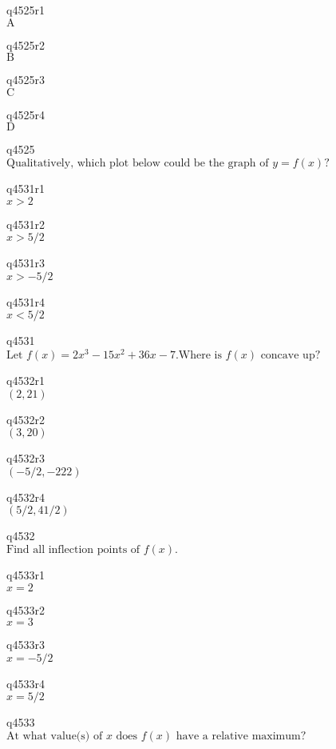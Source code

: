 q4525r1\\
\(\displaystyle \text{A} \)

q4525r2\\
\(\displaystyle \text{B} \)

q4525r3\\
\(\displaystyle \text{C} \)

q4525r4\\
\(\displaystyle \text{D} \)

q4525\\
\(\displaystyle \text{Qualitatively, which plot below could be the graph of } y = f(x)? \)

q4531r1\\
\(\displaystyle x > 2 \)

q4531r2\\
\(\displaystyle x > 5/2 \)

q4531r3\\
\(\displaystyle x > -5/2 \)

q4531r4\\
\(\displaystyle x < 5/2 \)

q4531\\
\(\displaystyle \text{Let } f(x) = 2x^3 - 15x^2 + 36x - 7. \text{Where is } f(x) \text{ concave up?} \)

q4532r1\\
\(\displaystyle (2, 21) \)

q4532r2\\
\(\displaystyle (3, 20) \)

q4532r3\\
\(\displaystyle (-5/2, -222) \)

q4532r4\\
\(\displaystyle (5/2, 41/2) \)

q4532\\
\(\displaystyle \text{Find all inflection points of } f(x). \)

q4533r1\\
\(\displaystyle x = 2 \)

q4533r2\\
\(\displaystyle x = 3 \)

q4533r3\\
\(\displaystyle x = -5/2 \)

q4533r4\\
\(\displaystyle x = 5/2 \)

q4533\\
\(\displaystyle \text{At what value(s) of } x \text{ does } f(x) \text{ have a relative maximum?} \)

